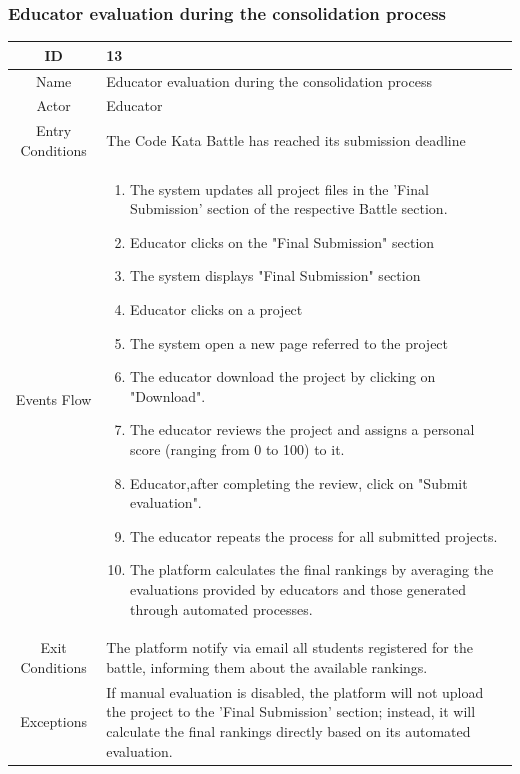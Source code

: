 \subsubsection{Educator evaluation during the consolidation process}
\begin{longtable}{|c| p{10cm}|}
        \hline
            ID & 13 \\
        \hline
            Name & Educator evaluation during the consolidation process \\
        \hline
            Actor & Educator\\
        \hline
            Entry Conditions &
            The Code Kata Battle has reached its submission deadline
                

        
         \\
        \hline
            Events Flow &   \begin{enumerate}
                              \item The system updates all project files in the 'Final Submission' section of the respective Battle section.
                              \item Educator clicks on the "Final Submission" section 
                              \item The system displays "Final Submission" section
                              \item  Educator clicks on a project
                              \item The system open a new page referred to the project
                              \item The educator download the project by clicking on "Download".
                                \item The educator reviews the project and assigns a personal score (ranging from 0 to 100) to it.
                                \item Educator,after completing the review, click on "Submit evaluation".
                                \item  The educator repeats the process for all submitted projects.
                                \item The  platform calculates the final rankings by averaging the evaluations provided by educators and those generated through automated processes.
                            \end{enumerate} \\
                            \hline
            Exit Conditions & The platform notify via email   all students registered for the battle, informing them about the available rankings.
    
                             
                                \\
        \hline
         Exceptions & If manual evaluation is disabled, the platform will not upload the project to the 'Final Submission' section; instead, it will calculate the final rankings directly based on its automated evaluation.\\
             \hline
         
            
    \end{longtable}

